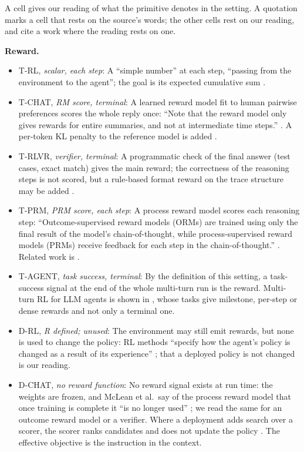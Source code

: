 \documentclass{article}
\providecommand{\tightlist}{\setlength{\itemsep}{0pt}\setlength{\parskip}{0pt}}
\begin{document}
A cell gives our reading of what the primitive denotes in the setting. A quotation marks a cell that rests on the source's words; the other cells rest on our reading, and cite a work where the reading rests on one.

\textbf{Reward.}

\begin{itemize}
\tightlist
\item
  T-RL, \emph{scalar, each step}: A ``simple number'' at each step, ``passing from the environment to the agent''; the goal is its expected cumulative sum \citep{sutton2018}.
\item
  T-CHAT, \emph{RM score, terminal}: A learned reward model fit to human pairwise preferences scores the whole reply once: ``Note that the reward model only gives rewards for entire summaries, and not at intermediate time steps.'' \citep{stiennon2020}. A per-token KL penalty to the reference model is added \citep{ziegler2019, ouyang2022}.
\item
  T-RLVR, \emph{verifier, terminal}: A programmatic check of the final answer (test cases, exact match) gives the main reward; the correctness of the reasoning steps is not scored, but a rule-based format reward on the trace structure may be added \citep{lambert2024, deepseekai2025}.
\item
  T-PRM, \emph{PRM score, each step}: A process reward model scores each reasoning step: ``Outcome-supervised reward models (ORMs) are trained using only the final result of the model's chain-of-thought, while process-supervised reward models (PRMs) receive feedback for each step in the chain-of-thought.'' \citep{lightman2024}. Related work is \citep{uesato2022, wang2024}.
\item
  T-AGENT, \emph{task success, terminal}: By the definition of this setting, a task-success signal at the end of the whole multi-turn run is the reward. Multi-turn RL for LLM agents is shown in \citep{zhou2024b}, whose tasks give milestone, per-step or dense rewards and not only a terminal one.
\item
  D-RL, \emph{R defined; unused}: The environment may still emit rewards, but none is used to change the policy: RL methods ``specify how the agent's policy is changed as a result of its experience'' \citep{sutton2018}; that a deployed policy is not changed is our reading.
\item
  D-CHAT, \emph{no reward function}: No reward signal exists at run time: the weights are frozen, and McLean et al.~say of the process reward model that once training is complete it ``is no longer used'' \citep{mclean2026}; we read the same for an outcome reward model or a verifier. Where a deployment adds search over a scorer, the scorer ranks candidates and does not update the policy \citep{snell2024}. The effective objective is the instruction in the context.

\end{itemize}
\end{document}
